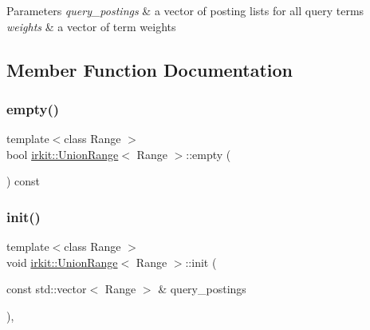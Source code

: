 \begin{DoxyParams}{Parameters}
{\em query\+\_\+postings} & a vector of posting lists for all query terms \\
\hline
{\em weights} & a vector of term weights \\
\hline
\end{DoxyParams}


\subsection{Member Function Documentation}
\mbox{\label{classirkit_1_1UnionRange_af12b028d791c9d9821c17ae30084fa86}} 
\subsubsection{\texorpdfstring{empty()}{empty()}}
{\footnotesize\ttfamily template$<$class Range $>$ \\
bool \hyperlink{classirkit_1_1UnionRange}{irkit\+::\+Union\+Range}$<$ Range $>$\+::empty (\begin{DoxyParamCaption}{ }\end{DoxyParamCaption}) const\hspace{0.3cm}{\ttfamily [inline]}}

\mbox{\label{classirkit_1_1UnionRange_aabdf133213056f20e0526c6736dbff3e}} 
\subsubsection{\texorpdfstring{init()}{init()}}
{\footnotesize\ttfamily template$<$class Range $>$ \\
void \hyperlink{classirkit_1_1UnionRange}{irkit\+::\+Union\+Range}$<$ Range $>$\+::init (\begin{DoxyParamCaption}\item[{const std\+::vector$<$ Range $>$ \&}]{query\+\_\+postings }\end{DoxyParamCaption})\hspace{0.3cm}{\ttfamily [inline]}, {\ttfamily [protected]}}



